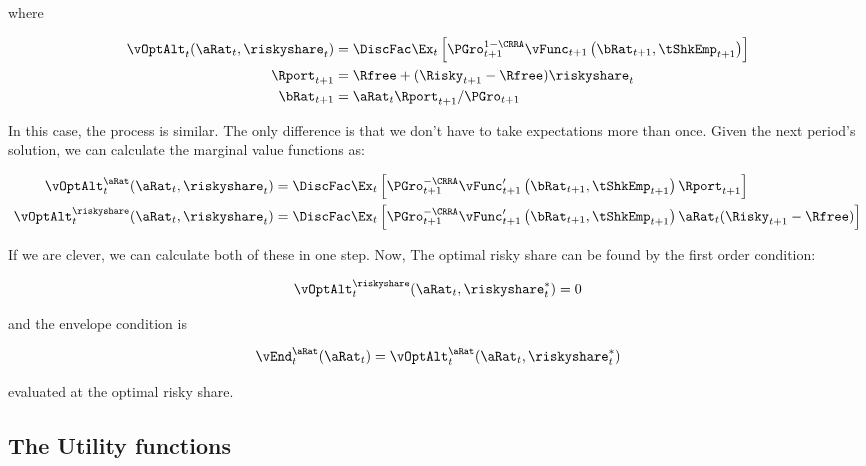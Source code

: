 \documentclass[\econtexRoot/EGMN]{subfiles}
\begin{document}
where

\begin{equation}
    \begin{split}
        \vOptAlt_{t}(\aRat_{t}, \riskyshare_{t}) & = \DiscFac \Ex_{t} \left[ \PGro_{t+1}^{1-\CRRA} \vFunc_{t+1}\left(\bRat_{t+1}, \tShkEmp_{t+1}\right)   \right] \\
        \Rport_{t+1} & = \Rfree + (\Risky_{t+1} - \Rfree) \riskyshare_{t} \\
        \bRat_{t+1} & = \aRat_{t} \Rport_{t+1} / \PGro_{t+1}
    \end{split}
\end{equation}

In this case, the process is similar. The only difference is that we don't have to take expectations more than once. Given the next period's solution, we can calculate the marginal value functions as:

\begin{equation}
    \begin{split}
        \vOptAlt_{t}^{\aRat}(\aRat_{t}, \riskyshare_{t}) & = \DiscFac \Ex_{t} \left[ \PGro_{t+1}^{-\CRRA} \vFunc_{t+1}'\left(\bRat_{t+1}, \tShkEmp_{t+1}\right) \Rport_{t+1}   \right] \\
        \vOptAlt_{t}^{\riskyshare}(\aRat_{t}, \riskyshare_{t}) & = \DiscFac \Ex_{t} \left[ \PGro_{t+1}^{-\CRRA} \vFunc_{t+1}'\left(\bRat_{t+1}, \tShkEmp_{t+1}\right) \aRat_{t} (\Risky_{t+1} - \Rfree)   \right] \\
    \end{split}
\end{equation}

If we are clever, we can calculate both of these in one step. Now, The optimal risky share can be found by the first order condition:

\begin{equation}
    \vOptAlt_{t}^{\riskyshare}(\aRat_{t}, \riskyshare_{t}^{*})  = 0
\end{equation}

and the envelope condition is

\begin{equation}
    \vEnd_{t}^{\aRat}(\aRat_{t}) = \vOptAlt_{t}^{\aRat}(\aRat_{t}, \riskyshare_{t}^{*})
\end{equation}

evaluated at the optimal risky share.

\subsection{The Utility functions}
\end{document}
